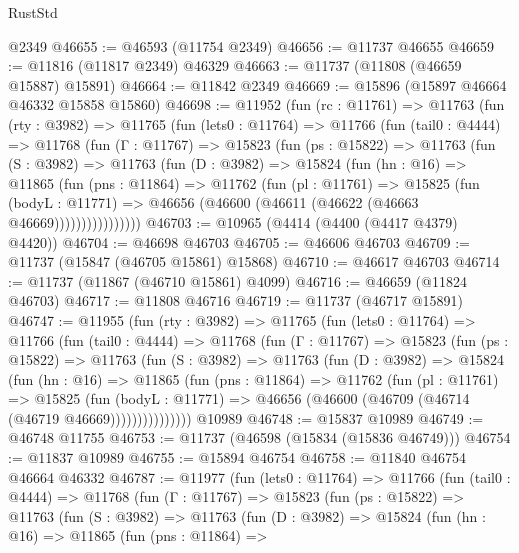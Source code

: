 \begin{lexlean}{RustStd}
\begin{coremodule}
    @2349
@46655 := @46593 (@11754 @2349)
@46656 := @11737 @46655
@46659 := @11816 (@11817 @2349) @46329
@46663 := @11737 (@11808 (@46659 @15887) @15891)
@46664 := @11842 @2349
@46669 := @15896 (@15897 @46664 @46332 @15858 @15860)
@46698 := @11952
    (fun (rc : @11761) =>
    @11763
      (fun (rty : @3982) =>
      @11765
        (fun (lets0 : @11764) =>
        @11766
          (fun (tail0 : @4444) =>
          @11768
            (fun (Γ : @11767) =>
            @15823
              (fun (ps : @15822) =>
              @11763
                (fun (S : @3982) =>
                @11763
                  (fun (D : @3982) =>
                  @15824
                    (fun (hn : @16) =>
                    @11865
                      (fun (pns : @11864) =>
                      @11762
                        (fun (pl : @11761) =>
                        @15825
                          (fun (bodyL : @11771) =>
                          @46656 (@46600 (@46611 (@46622 (@46663 @46669))))))))))))))))
@46703 := @10965 (@4414 (@4400 (@4417 @4379) @4420))
@46704 := @46698 @46703
@46705 := @46606 @46703
@46709 := @11737 (@15847 (@46705 @15861) @15868)
@46710 := @46617 @46703
@46714 := @11737 (@11867 (@46710 @15861) @4099)
@46716 := @46659 (@11824 @46703)
@46717 := @11808 @46716
@46719 := @11737 (@46717 @15891)
@46747 := @11955
    (fun (rty : @3982) =>
    @11765
      (fun (lets0 : @11764) =>
      @11766
        (fun (tail0 : @4444) =>
        @11768
          (fun (Γ : @11767) =>
          @15823
            (fun (ps : @15822) =>
            @11763
              (fun (S : @3982) =>
              @11763
                (fun (D : @3982) =>
                @15824
                  (fun (hn : @16) =>
                  @11865
                    (fun (pns : @11864) =>
                    @11762
                      (fun (pl : @11761) =>
                      @15825
                        (fun (bodyL : @11771) =>
                        @46656 (@46600 (@46709 (@46714 (@46719 @46669)))))))))))))))
    @10989
@46748 := @15837 @10989
@46749 := @46748 @11755
@46753 := @11737 (@46598 (@15834 (@15836 @46749)))
@46754 := @11837 @10989
@46755 := @15894 @46754
@46758 := @11840 @46754 @46664 @46332
@46787 := @11977
    (fun (lets0 : @11764) =>
    @11766
      (fun (tail0 : @4444) =>
      @11768
        (fun (Γ : @11767) =>
        @15823
          (fun (ps : @15822) =>
          @11763
            (fun (S : @3982) =>
            @11763
              (fun (D : @3982) =>
              @15824
                (fun (hn : @16) =>
                @11865
                  (fun (pns : @11864) =>

\end{coremodule}
\end{lexlean}
